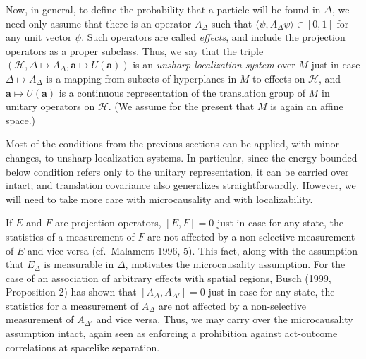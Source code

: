 \documentclass[12pt]{article}
\theoremstyle{remark}
\newcommand{\hil}[1]{\mathcal{#1}}
\begin{document}
Now, in general, to define the probability that a particle will be
found in $\Delta$, we need only assume that there is an operator
$A_{\Delta}$ such that $\langle \psi ,A_{\Delta}\psi \rangle \in
[0,1]$ for any unit vector $\psi$.  Such operators are called
\emph{effects}, and include the projection operators as a proper
subclass.  Thus, we say that the triple $(\hil{H},\Delta \mapsto
A_{\Delta},\mathbf{a}\mapsto U(\mathbf{a}))$ is an \emph{unsharp
  localization system} over $M$ just in case $\Delta \mapsto
A_{\Delta}$ is a mapping from subsets of hyperplanes in $M$ to effects
on $\hil{H}$, and $\mathbf{a}\mapsto U(\mathbf{a})$ is a continuous
representation of the translation group of $M$ in unitary operators on
$\hil{H}$.  (We assume for the present that $M$ is again an affine
space.)

Most of the conditions from the previous sections can be applied, with
minor changes, to unsharp localization systems.  In particular, since
the energy bounded below condition refers only to the unitary
representation, it can be carried over intact; and translation
covariance also generalizes straightforwardly.  However, we will need
to take more care with microcausality and with localizability.

If $E$ and $F$ are projection operators, $[E,F]=0$ just in case for
any state, the statistics of a measurement of $F$ are not affected by
a non-selective measurement of $E$ and vice versa (cf.~Malament 1996,
5).  This fact, along with the assumption that $E_{\Delta}$ is
measurable in $\Delta$, motivates the microcausality assumption.  For
the case of an association of arbitrary effects with spatial regions,
Busch (1999, Proposition 2) has shown that $[A_{\Delta},A_{\Delta
  '}]=0$ just in case for any state, the statistics for a measurement
of $A_{\Delta}$ are not affected by a non-selective measurement of
$A_{\Delta '}$ and vice versa.  Thus, we may carry over the
microcausality assumption intact, again seen as enforcing a
prohibition against act-outcome correlations at spacelike separation.
\end{document}
